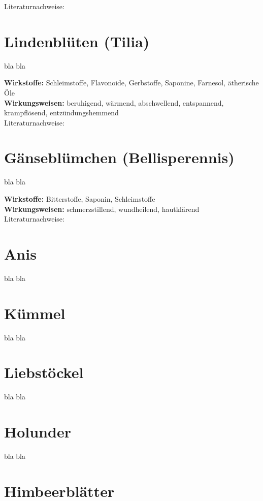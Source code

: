 Literaturnachweise: \cite{nedoma2018heilsalben}

\section{Lindenblüten (Tilia)}

bla bla

\textbf{Wirkstoffe:} Schleimstoffe, Flavonoide, Gerbstoffe, Saponine, Farnesol, ätherische Öle \\

\textbf{Wirkungsweisen:} beruhigend, wärmend, abschwellend, entspannend, krampflösend, entzündungshemmend \\

Literaturnachweise: \cite{nedoma2018heilsalben}

\section{Gänseblümchen (Bellisperennis)}

bla bla

\textbf{Wirkstoffe:} Bitterstoffe, Saponin, Schleimstoffe\\

\textbf{Wirkungsweisen:} schmerzstillend, wundheilend, hautklärend\\

Literaturnachweise: \cite{nedoma2018heilsalben}

\section{Anis}

bla bla

\section{Kümmel}

bla bla

\section{Liebstöckel}

bla bla

\section{Holunder}

bla bla

\section{Himbeerblätter}

